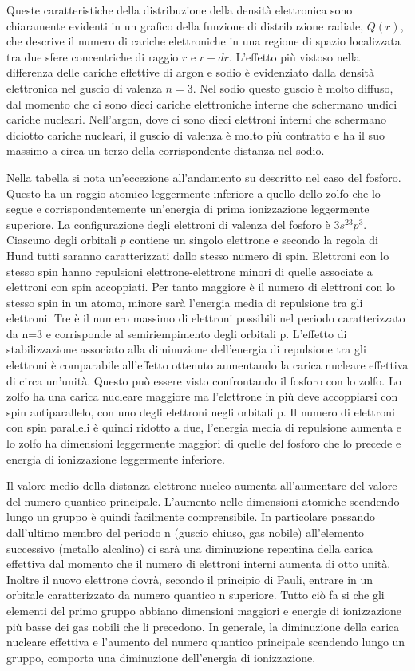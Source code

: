 Queste caratteristiche della distribuzione della densità elettronica sono chiaramente evidenti in un grafico della funzione di distribuzione radiale, $Q(r)$, che descrive il numero di cariche elettroniche in una regione di spazio localizzata tra due sfere concentriche di raggio $r$ e $r + dr$. L'effetto più vistoso nella differenza delle cariche effettive di argon e sodio è evidenziato dalla densità elettronica nel guscio di valenza $n=3$. Nel sodio questo guscio è molto diffuso, dal momento che ci sono dieci cariche elettroniche interne che schermano undici cariche nucleari. Nell'argon, dove ci sono dieci elettroni interni che schermano diciotto cariche nucleari, il guscio di valenza è molto più contratto e ha il suo massimo a circa un terzo della corrispondente distanza nel sodio.
\begin{obs}
    Nella tabella si nota un'eccezione all'andamento su descritto nel caso del fosforo. Questo ha un raggio atomico leggermente inferiore a quello dello zolfo che lo segue e corrispondentemente un'energia di prima ionizzazione leggermente superiore. La configurazione degli elettroni di valenza del fosforo è $3s^23p^3$. Ciascuno degli orbitali $p$ contiene un singolo elettrone e secondo la regola di Hund tutti saranno caratterizzati dallo stesso numero di spin. Elettroni con lo stesso spin hanno repulsioni elettrone-elettrone minori di quelle associate a elettroni con spin accoppiati. Per tanto maggiore è il numero di elettroni con lo stesso spin in un atomo, minore sarà l'energia media di repulsione tra gli elettroni. Tre è il numero massimo di elettroni possibili nel periodo caratterizzato da n=3 e corrisponde al semiriempimento degli orbitali p. L'effetto di stabilizzazione associato alla diminuzione dell'energia di repulsione tra gli elettroni è comparabile all'effetto ottenuto aumentando la carica nucleare effettiva di circa un'unità. Questo può essere visto confrontando il fosforo con lo zolfo. Lo zolfo ha una carica nucleare maggiore ma l'elettrone in più deve accoppiarsi con spin antiparallelo, con uno degli elettroni negli orbitali p. Il numero di elettroni con spin paralleli è quindi ridotto a due, l'energia media di repulsione aumenta e lo zolfo ha dimensioni leggermente maggiori di quelle del fosforo che lo precede e energia di ionizzazione leggermente inferiore. 
\end{obs}

Il valore medio della distanza elettrone nucleo aumenta all'aumentare del valore del numero quantico principale. L'aumento nelle dimensioni atomiche scendendo lungo un gruppo è quindi facilmente comprensibile. In particolare passando dall'ultimo membro del periodo n (guscio chiuso, gas nobile) all'elemento successivo (metallo alcalino) ci sarà una diminuzione repentina della carica effettiva dal momento che il numero di elettroni interni aumenta di otto unità. Inoltre il nuovo elettrone dovrà, secondo il principio di Pauli, entrare in un orbitale caratterizzato da numero quantico n superiore. Tutto ciò fa si che gli elementi del primo gruppo abbiano dimensioni maggiori e energie di ionizzazione più basse dei gas nobili che li precedono. In generale, la diminuzione della carica nucleare effettiva e l'aumento del numero quantico principale scendendo lungo un gruppo, comporta una diminuzione
dell'energia di ionizzazione.

